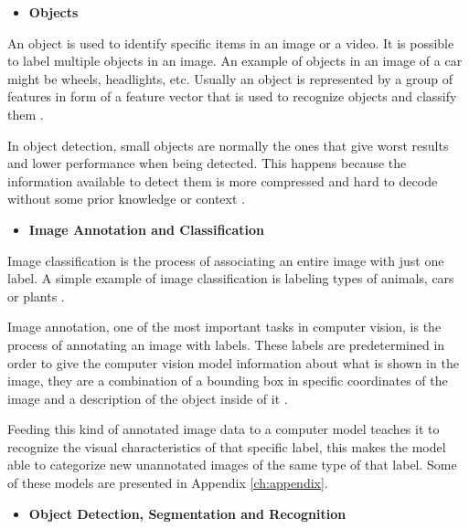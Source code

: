     \begin{itemize}
        \item \textbf{Objects}
    \end{itemize}

 
    \par An object is used to identify specific items in an image or a video. It is possible to label multiple objects in an image. An example of objects in an image of a car might be wheels, headlights, etc. Usually an object is represented by a group of features in form of a feature vector that is used to recognize objects and classify them \cite{Tiwari2013}.

    \par In object detection, small objects are normally the ones that give  worst results and lower performance when being detected. This happens because the information available to detect them is more compressed and hard to decode without some prior knowledge or context \cite{Agarwal2019}.


\begin{itemize}
    \item \textbf{Image Annotation and Classification}
\end{itemize}

    Image classification is the process of associating an entire image with just one label. A simple example of image classification is labeling types of animals, cars or plants \cite{Feng2019}. \par
    Image annotation, one of the most important tasks in computer vision, is the process of annotating an image with labels. These labels are predetermined in order to give the computer vision model information about what is shown in the image, they are a combination of a bounding box in specific coordinates of the image  and a description of the object inside of it \cite{annotation}. \par

    Feeding this kind of annotated image data to a computer model teaches it to recognize the visual characteristics of that specific label, this makes the model able to categorize new unannotated images of the same type of that label. Some of these models are presented in Appendix \ref{ch:appendix}.

    \begin{itemize}
        \item \textbf{Object Detection, Segmentation and Recognition}
    \end{itemize}
    

